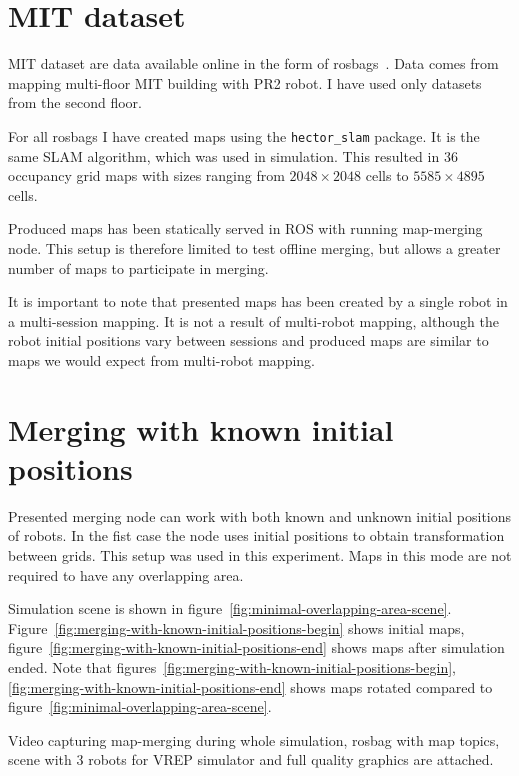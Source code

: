 \section{\gls{MIT} dataset}
\label{sec:mit-dataset}

\gls{MIT} dataset are data available online in the form of rosbags~\cite{Fallon2013}. Data comes from mapping multi-floor \gls{MIT} building with PR2 robot. I have used only datasets from the second floor.

For all rosbags I have created maps using the \texttt{hector\_slam} package. It is the same \gls{SLAM} algorithm, which was used in simulation. This resulted in $36$ occupancy grid maps with sizes ranging from $2048 \times 2048$ cells to $5585 \times 4895$ cells.

Produced maps has been statically served in \gls{ROS} with running map-merging node. This setup is therefore limited to test offline merging, but allows a greater number of maps to participate in merging.

It is important to note that presented maps has been created by a single robot in a multi-session mapping. It is not a result of multi-robot mapping, although the robot initial positions vary between sessions and produced maps are similar to maps we would expect from multi-robot mapping.

\section{Merging with known initial positions}
\label{sec:merging-with-known-initial-positions}

Presented merging node can work with both known and unknown initial positions of robots. In the fist case the node uses initial positions to obtain transformation between grids. This setup was used in this experiment. Maps in this mode are not required to have any overlapping area.

Simulation scene is shown in figure~\ref{fig:minimal-overlapping-area-scene}. Figure~\ref{fig:merging-with-known-initial-positions-begin} shows initial maps, figure~\ref{fig:merging-with-known-initial-positions-end} shows maps after simulation ended. Note that figures~\ref{fig:merging-with-known-initial-positions-begin}, \ref{fig:merging-with-known-initial-positions-end} shows maps rotated compared to figure~\ref{fig:minimal-overlapping-area-scene}.

Video capturing map-merging during whole simulation, rosbag with map topics, scene with $3$ robots for \gls{VREP} simulator and full quality graphics are attached.

